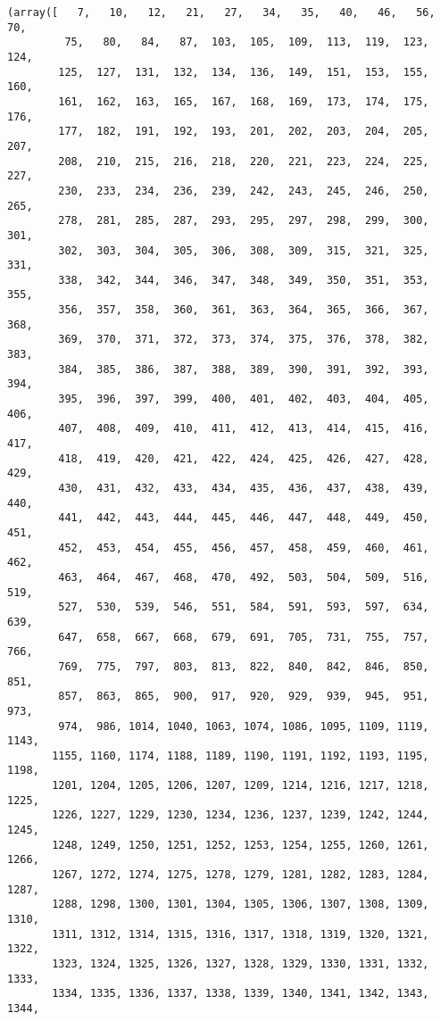 \documentclass[11pt]{article}
\begin{document}
    \begin{Verbatim}[commandchars=\\\{\}]
(array([   7,   10,   12,   21,   27,   34,   35,   40,   46,   56,   70,
         75,   80,   84,   87,  103,  105,  109,  113,  119,  123,  124,
        125,  127,  131,  132,  134,  136,  149,  151,  153,  155,  160,
        161,  162,  163,  165,  167,  168,  169,  173,  174,  175,  176,
        177,  182,  191,  192,  193,  201,  202,  203,  204,  205,  207,
        208,  210,  215,  216,  218,  220,  221,  223,  224,  225,  227,
        230,  233,  234,  236,  239,  242,  243,  245,  246,  250,  265,
        278,  281,  285,  287,  293,  295,  297,  298,  299,  300,  301,
        302,  303,  304,  305,  306,  308,  309,  315,  321,  325,  331,
        338,  342,  344,  346,  347,  348,  349,  350,  351,  353,  355,
        356,  357,  358,  360,  361,  363,  364,  365,  366,  367,  368,
        369,  370,  371,  372,  373,  374,  375,  376,  378,  382,  383,
        384,  385,  386,  387,  388,  389,  390,  391,  392,  393,  394,
        395,  396,  397,  399,  400,  401,  402,  403,  404,  405,  406,
        407,  408,  409,  410,  411,  412,  413,  414,  415,  416,  417,
        418,  419,  420,  421,  422,  424,  425,  426,  427,  428,  429,
        430,  431,  432,  433,  434,  435,  436,  437,  438,  439,  440,
        441,  442,  443,  444,  445,  446,  447,  448,  449,  450,  451,
        452,  453,  454,  455,  456,  457,  458,  459,  460,  461,  462,
        463,  464,  467,  468,  470,  492,  503,  504,  509,  516,  519,
        527,  530,  539,  546,  551,  584,  591,  593,  597,  634,  639,
        647,  658,  667,  668,  679,  691,  705,  731,  755,  757,  766,
        769,  775,  797,  803,  813,  822,  840,  842,  846,  850,  851,
        857,  863,  865,  900,  917,  920,  929,  939,  945,  951,  973,
        974,  986, 1014, 1040, 1063, 1074, 1086, 1095, 1109, 1119, 1143,
       1155, 1160, 1174, 1188, 1189, 1190, 1191, 1192, 1193, 1195, 1198,
       1201, 1204, 1205, 1206, 1207, 1209, 1214, 1216, 1217, 1218, 1225,
       1226, 1227, 1229, 1230, 1234, 1236, 1237, 1239, 1242, 1244, 1245,
       1248, 1249, 1250, 1251, 1252, 1253, 1254, 1255, 1260, 1261, 1266,
       1267, 1272, 1274, 1275, 1278, 1279, 1281, 1282, 1283, 1284, 1287,
       1288, 1298, 1300, 1301, 1304, 1305, 1306, 1307, 1308, 1309, 1310,
       1311, 1312, 1314, 1315, 1316, 1317, 1318, 1319, 1320, 1321, 1322,
       1323, 1324, 1325, 1326, 1327, 1328, 1329, 1330, 1331, 1332, 1333,
       1334, 1335, 1336, 1337, 1338, 1339, 1340, 1341, 1342, 1343, 1344,

\end{Verbatim}
\end{document}
